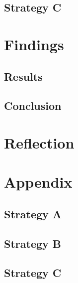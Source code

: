 \documentclass[12pt]{article}
\begin{document}
\subsection{Strategy C}
\section{Findings}
\subsection{Results}
\subsection{Conclusion}
\section{Reflection}
\section{Appendix}
\subsection{Strategy A}
\subsection{Strategy B}
\subsection{Strategy C}


\end{document}
